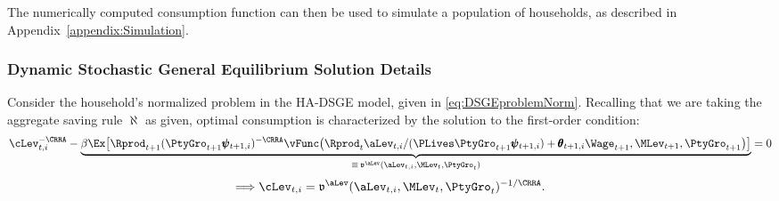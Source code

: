 The numerically computed consumption function can then be used to simulate a population of households,
as described in Appendix~\ref{appendix:Simulation}.


\subsubsection{Dynamic Stochastic General Equilibrium Solution Details} \label{app:Sol_DSGE}

Consider the household's normalized problem in the HA-DSGE model,
given in \eqref{eq:DSGEproblemNorm}. Recalling that we are taking the
aggregate saving rule $\aleph$ as given, optimal consumption is
characterized by the solution to the first-order condition:
\begin{equation}\label{eq:DSGEFOC}
\cLev_{t,i}^{-\CRRA} - \underbrace{\beta \Ex \big[ \Rprod_{t+1} (\PtyGro_{t+1} \pmb{\psi}_{t+1,i})^{-\CRRA}\vFunc\big(\Rprod_t \aLev_{t,i}/(\PLives \PtyGro_{t+1}\pmb{\psi}_{t+1,i}) + \pmb{\theta}_{t+1,i} \Wage_{t+1},\MLev_{t+1},\PtyGro_{t+1}\big) \big]}_{\equiv\, \mathfrak{v}^\aLev(\aLev_{t,i},\MLev_t,\PtyGro_t)} = 0
\end{equation}
\begin{equation*}
\Longrightarrow \cLev_{t,i} = \mathfrak{v}^\aLev(\aLev_{t,i},\MLev_t,\PtyGro_t)^{-1/\CRRA}.
\end{equation*}

